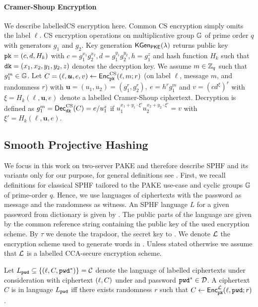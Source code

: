 \paragraph{Cramer-Shoup Encryption}\label{sec:csencryption}

We describe labelled\ac{CS} encryption here.
Common \ac{CS} encryption simply omits the label $\ell$.
\ac{CS} encryption operations on multiplicative group $\mathbb{G}$ of prime order $q$ with generators $g_1$ and $g_2$.
Key generation $\mathsf{KGen_{PKE}}(\lambda)$ returns public key $\mathtt{pk}=(c,d,H_k)$ with $c=g_{1}^{x_1}g_{2}^{x_2}, d=g_{1}^{y_1}g_{2}^{y_2}, h=g_{1}^z$ and hash function $H_k$ such that $\mathtt{dk}=(x_1,x_2,y_1,y_2,z)$ denotes the decryption key.
We assume $m\in\mathbb{Z}_q$ such that $g_1^m\in\mathbb{G}$.
Let $C=(\ell,\bm{u},e,v)\gets\mathsf{Enc}^{\mathrm{CS}}_\mathtt{pk}(\ell,m;r)$ (on label $\ell$, message $m$, and randomness $r$) with $\bm{u}=(u_1,u_2)=(g_{1}^r,g_{2}^r),~ e=h^rg_1^m$ and $v=(cd^{\xi})^r$ with $\xi=H_k(\ell,\bm{u},e)$ denote a labelled Cramer-Shoup ciphertext.
Decryption is defined as $g_1^m=\mathsf{Dec}_\mathtt{dk}^\mathrm{CS}(C)=e/u_1^z$ if $u_1^{x_1+y_1\cdot \xi'}u_2^{x_2+y_2\cdot \xi'}=v$ with $\xi'=H_k(\ell,\bm{u},e)$.


\subsection{Smooth Projective Hashing}
We focus in this work on two-server PAKE and therefore describe SPHF and its variants only for our purpose, for general definitions see \cite{cryptoeprint:2013:034}.
First, we recall definitions for classical SPHF tailored to the PAKE use-case and cyclic groups $\mathbb{G}$ of prime-order $q$.
Hence, we use languages of ciphertexts with the password as message and the randomness as witness.
An SPHF language $L$ for a given password \pwd from dictionary \cD is given by \Lpwd. 
The public parts of the language are given by the common reference string \crs containing the public key \pk of the used encryption scheme.
By $\tau$ we denote the \crs trapdoor, the secret key to \pk.
We denote $\mathcal{L}$ the encryption scheme used to generate words in \Lpwd.
Unless stated otherwise we assume that $\mathcal{L}$ is a labelled CCA-secure encryption scheme.


\begin{definition}\label{def:language}
Let $L_\mathtt{pwd} \subseteq \{(\ell, C, \mathtt{pwd}^\ast)\}=\mathcal{C}$ denote the language of labelled ciphertexts under consideration with ciphertext $(\ell,C)$ under \pk and password $\mathtt{pwd}^\ast\in\mathcal{D}$.
A ciphertext $C$ is in language $L_\mathtt{pwd}$ iff there exists randomness $r$ such that $C\gets\mathsf{Enc}^{\mathcal{L}}_\mathtt{pk}(\ell,\mathtt{pwd};r)$.
\end{definition}

